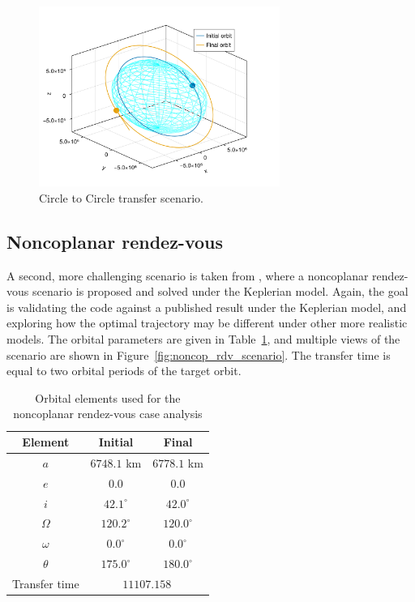 \begin{figure}[htbp]
    \centering
    \includegraphics[width=0.7\textwidth]{../results/two_body/hohmann/scenario.png}
    \caption{Circle to Circle transfer scenario.}
    \label{fig:hohmann_scenario}
\end{figure}
\FloatBarrier
\subsection{Noncoplanar rendez-vous}

A second, more challenging scenario is taken from , where a noncoplanar rendez-vous scenario is proposed and solved under the Keplerian model. Again, the goal is validating the code against a published result under the Keplerian model, and exploring how the optimal trajectory may be different under other more realistic models. The orbital parameters are given in Table~\ref{tab:noncop_rdv_orb_elems}, and multiple views of the scenario are shown in Figure~\ref{fig:noncop_rdv_scenario}. The transfer time is equal to two orbital periods of the target orbit.

\begin{table}[htbp]
    \centering
    \begin{tabular}{ccc} \toprule
        Element & Initial & Final \\ \midrule
        \(a\)      & \(6748.1\) km         & \(6778.1\) km   \\
        \(e\)      & \(0.0\)            & \(0.0\)        \\
        \(i\)      & \(42.1^\circ\)      & \(42.0^\circ\) \\
        \(\Omega\) & \(120.2^\circ\)   & \(120.0^\circ\)  \\
        \(\omega\) & \(0.0^\circ\)  & \(0.0^\circ\)  \\
        \(\theta\) & \(175.0^\circ\)  & \(180.0^\circ\)  \\ 
        Transfer time & \multicolumn{2}{c}{\(11107.158\)} \\\bottomrule
    \end{tabular}
    \caption{Orbital elements used for the noncoplanar rendez-vous case analysis}
    \label{tab:noncop_rdv_orb_elems}
\end{table}


